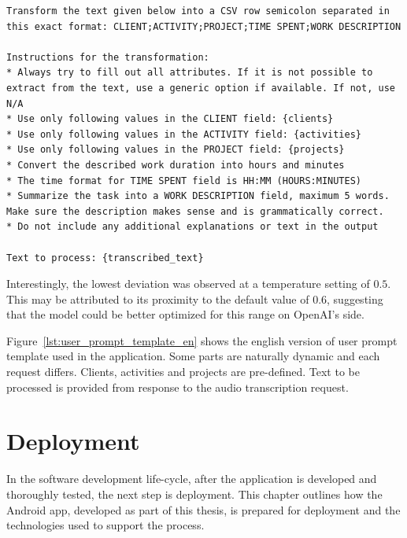 \documentclass[
  digital,     %
  oneside,     %
  nosansbold,  %
  nocolorbold, %
  lof,         %
  lot,         %
]{fithesis4}
\begin{document}
\begin{listing}[H]
    
\begin{lstlisting}[caption={English version of the user prompt template used in the application}, label={lst:user_prompt_template_en}, floatplacement=ht, showstringspaces=false]
Transform the text given below into a CSV row semicolon separated in this exact format: CLIENT;ACTIVITY;PROJECT;TIME SPENT;WORK DESCRIPTION

Instructions for the transformation:
* Always try to fill out all attributes. If it is not possible to extract from the text, use a generic option if available. If not, use N/A
* Use only following values in the CLIENT field: {clients}
* Use only following values in the ACTIVITY field: {activities}
* Use only following values in the PROJECT field: {projects}
* Convert the described work duration into hours and minutes
* The time format for TIME SPENT field is HH:MM (HOURS:MINUTES)
* Summarize the task into a WORK DESCRIPTION field, maximum 5 words. Make sure the description makes sense and is grammatically correct.
* Do not include any additional explanations or text in the output

Text to process: {transcribed_text}
\end{lstlisting}
\end{listing}

Interestingly, the lowest deviation was observed at a temperature setting of $0.5$. This may be attributed to its proximity to the default value of $0.6$, suggesting that the model could be better optimized for this range on OpenAI's side.

Figure~\ref{lst:user_prompt_template_en} shows the english version of user prompt template used in the application. Some parts are naturally dynamic and each request differs. Clients, activities and projects are pre-defined. Text to be processed is provided from response to the audio transcription request.

\chapter{Deployment}
\label{chap:deployment}

In the software development life-cycle, after the application is developed and thoroughly tested, the next step is deployment. This chapter outlines how the Android app, developed as part of this thesis, is prepared for deployment and the technologies used to support the process.
\end{document}

